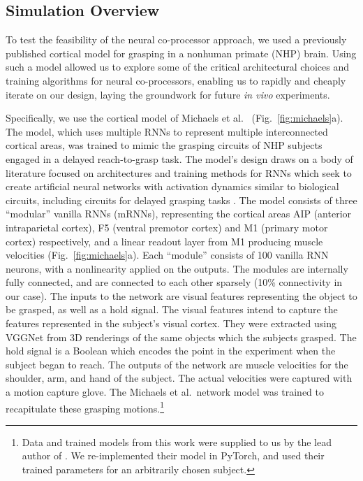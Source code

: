 \documentclass[12pt]{iopart}
\begin{document}
\subsection{Simulation Overview}
To test the feasibility of the neural co-processor approach, we used a previously published cortical model for
grasping in a nonhuman primate (NHP) brain. Using such a model allowed us to explore some of the critical
architectural choices and training algorithms for neural co-processors, enabling us to rapidly and cheaply iterate on our
design, laying the groundwork for future \textit{in vivo} experiments. 

Specifically, we use the cortical model of Michaels et al.\ \cite{michaels.mrnn}
(Fig.~\ref{fig:michaels}a). The model, which uses multiple RNNs to represent multiple interconnected cortical areas,
was trained to mimic the grasping circuits of NHP subjects engaged in a delayed reach-to-grasp task.
The model's design draws on a body of literature focused on architectures and training methods for RNNs which
seek to create artificial neural networks with activation dynamics similar to biological circuits,
including circuits for delayed grasping tasks \cite{sussillo.mrnn}. The model consists of three
``modular'' vanilla RNNs (mRNNs), representing the cortical areas AIP (anterior intraparietal cortex), F5 (ventral
premotor cortex) and M1 (primary motor cortex) respectively, and a linear readout layer from M1 producing muscle
velocities (Fig.~\ref{fig:michaels}a). Each ``module'' consists of 100 vanilla RNN neurons, with a nonlinearity
applied on the outputs. The modules are internally fully connected, and are connected to each other sparsely
(10\% connectivity in our case). The inputs to the network are visual features
representing the object to be grasped, as well as a hold signal. The visual features
intend to capture the features represented in the subject's visual cortex. They were extracted using
VGGNet \cite{simonyan.vgg} from 3D renderings of the same objects which the subjects grasped. The hold signal is
a Boolean which encodes the point in the experiment when the subject began to reach. The outputs of the
network are muscle velocities for the shoulder, arm, and hand of the subject. The actual
velocities were captured with a motion capture glove. The Michaels et al.\ network model 
was trained to recapitulate these grasping motions.\footnote{Data and trained models from this work
were supplied to us by the lead author of \cite{michaels.mrnn}. We re-implemented their model in PyTorch,
and used their trained parameters for an arbitrarily chosen subject.}
\end{document}
